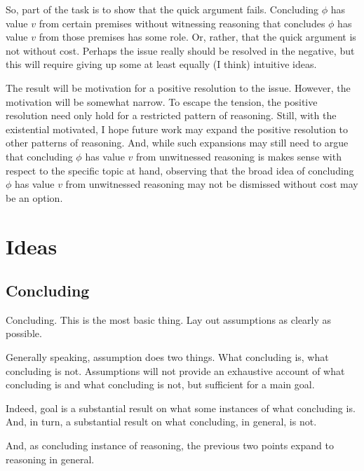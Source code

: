 \begin{note}
  So, part of the task is to show that the quick argument fails.
  Concluding \(\phi\) has value \(v\) from certain premises without witnessing reasoning that concludes \(\phi\) has value \(v\) from those premises has some role.
  Or, rather, that the quick argument is not without cost.
  Perhaps the issue really should be resolved in the negative, but this will require giving up some at least equally (I think) intuitive ideas.

  The result will be motivation for a positive resolution to the issue.
  However, the motivation will be somewhat narrow.
  To escape the tension, the positive resolution need only hold for a restricted pattern of reasoning.
  Still, with the existential motivated, I hope future work may expand the positive resolution to other patterns of reasoning.
  And, while such expansions may still need to argue that concluding \(\phi\) has value \(v\) from unwitnessed reasoning is makes sense with respect to the specific topic at hand, observing that the broad idea of concluding \(\phi\) has value \(v\) from unwitnessed reasoning may not be dismissed without cost may be an option.
\end{note}

\section{Ideas}
\label{sec:ideas-1}

\subsection{Concluding}
\label{sec:outline:concluding}

\begin{note}[Overview]
  Concluding.
  This is the most basic thing.
  Lay out assumptions as clearly as possible.

  Generally speaking, assumption does two things.
  What concluding is, what concluding is not.
  Assumptions will not provide an exhaustive account of what concluding is and what concluding is not, but sufficient for a main goal.

  Indeed, goal is a substantial result on what some instances of what concluding is.
  And, in turn, a substantial result on what concluding, in general, is not.

  And, as concluding instance of reasoning, the previous two points expand to reasoning in general.
\end{note}


